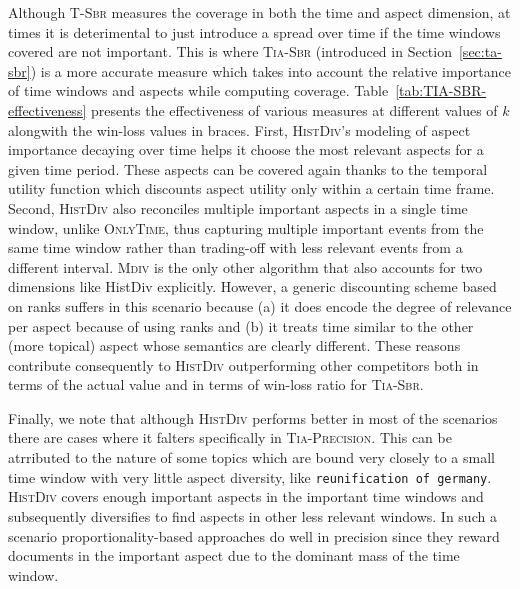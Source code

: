 Although \textsc{T-Sbr} measures the coverage in both the time and aspect dimension, at times it is deterimental to just introduce a spread over time if the time windows covered are not important. This is where \textsc{Tia-Sbr} (introduced in Section~\ref{sec:ta-sbr}) is a more accurate measure which takes into account the relative importance of time windows and aspects while computing coverage. Table~\ref{tab:TIA-SBR-effectiveness} presents the effectiveness of various measures at different values of $k$ alongwith the win-loss values in braces. First, \textsc{HistDiv}'s modeling of aspect importance decaying over time helps it choose the most relevant aspects for a given time period. These aspects can be covered again thanks to the temporal utility function which discounts aspect utility only within a certain time frame. Second, \textsc{HistDiv} also reconciles multiple important aspects in a single time window, unlike \textsc{OnlyTime}, thus capturing multiple important events from the same time window rather than trading-off with less relevant events from a different interval. \textsc{Mdiv} is the only other algorithm that also accounts for two dimensions like HistDiv explicitly. However, a generic discounting scheme based on ranks suffers in this scenario because (a) it does encode the degree of relevance per aspect because of using ranks and (b) it treats time similar to the other (more topical) aspect whose semantics are clearly different. These reasons contribute consequently to \textsc{HistDiv} outperforming other competitors both in terms of the actual value and in terms of win-loss ratio for \textsc{Tia-Sbr}.

Finally, we note that although \textsc{HistDiv} performs better in most of the scenarios there are cases where it falters specifically in \textsc{Tia-Precision}. 
This can be atrributed to the nature of some topics which are bound very closely to a small time window with very little aspect diversity, like \texttt{reunification of germany}. \textsc{HistDiv} covers enough important aspects in the important time windows and subsequently diversifies to find aspects in other less relevant windows. In such a scenario proportionality-based approaches do well in precision since they reward documents in the important aspect due to the dominant mass of the time window.

